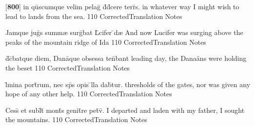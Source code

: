 \latline
  {[\textbf{800}] in qu\={}scumque velim pelag\={} d\={}d\={}cere terr\={}s.}
  { in whatever way I might wish to lead to lands from the sea. }
  {110}
  { CorrectedTranslation }
  { Notes }


\latline
  {Jamque jug\={\macron {\i}}s summ{\ae} surg\={}bat L\={}cifer \={}d{\ae}}
  { And now Lucifer was surging above the peaks of the mountain ridge of Ida }
  {110}
  { CorrectedTranslation }
  { Notes }


\latline
  {d\={}c\={}batque diem, Dana\={\macron {\i}}que obsessa ten\={}bant}
  { leading day, the Dana\"ans were holding the beset}
  {110}
  { CorrectedTranslation }
  { Notes }


\latline
  {l\={\macron {\i}}mina port\={}rum, nec sp\={}s opis \={}lla dab\={}tur.}
  { thresholds of the gates, nor was given any hope of any other help.  }
  {110}
  { CorrectedTranslation }
  { Notes }


\latline
  {Cess\={\macron {\i}} et subl\={}t\={} mont\={\macron {\i}}s genit\={}re pet\={\macron {\i}}v\={\macron {\i}}.}
  { I departed and laden with my father, I sought the mountains. }
  {110}
  { CorrectedTranslation }
  { Notes }


